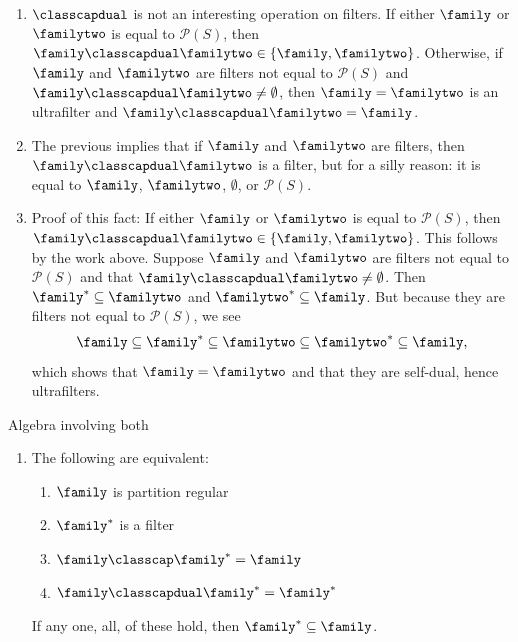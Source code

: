 \begin{enumerate}
\begin{enumerate}
        \item $\classcapdual$ is not an interesting operation on filters.  If either $\family$ or $\familytwo$ is equal to $\mathcal{P}(S)$, then $\family \classcapdual \familytwo \in \{\family, \familytwo\}$.  Otherwise, if $\family$ and $\familytwo$ are filters not equal to $\mathcal{P}(S)$ and $\family \classcapdual \familytwo \neq \emptyset$, then $\family = \familytwo$ is an ultrafilter and $\family \classcapdual \familytwo = \family$.
        
        \item The previous implies that if $\family$ and $\familytwo$ are filters, then $\family \classcapdual \familytwo$ is a filter, but for a silly reason: it is equal to $\family$, $\familytwo$, $\emptyset$, or $\mathcal{P}(S)$.
        
        \item Proof of this fact: If either $\family$ or $\familytwo$ is equal to $\mathcal{P}(S)$, then $\family \classcapdual \familytwo \in \{\family, \familytwo\}$.  This follows by the work above.  Suppose $\family$ and $\familytwo$ are filters not equal to $\mathcal{P}(S)$ and that $\family \classcapdual \familytwo \neq \emptyset$. Then $\family^* \subseteq \familytwo$ and $\familytwo^* \subseteq \family$.  But because they are filters not equal to $\mathcal{P}(S)$, we see
        \[\family \subseteq \family^* \subseteq \familytwo \subseteq \familytwo^* \subseteq \family,\]
        which shows that $\family = \familytwo$ and that they are self-dual, hence ultrafilters.
    \end{enumerate}
\end{enumerate}

Algebra involving both
\begin{enumerate}
    \item {} The following are equivalent: 
    \begin{enumerate}
        \item $\family$ is partition regular
        \item $\family^*$ is a filter
        \item $\family \classcap \family^* = \family$
        \item $\family \classcapdual \family^* = \family^*$
    \end{enumerate}
    If any one, all, of these hold, then $\family^* \subseteq \family$.
\end{enumerate}

